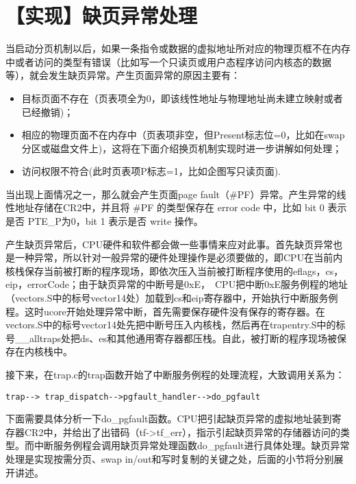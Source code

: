 \section{【实现】缺页异常处理}\label{ux5b9eux73b0ux7f3aux9875ux5f02ux5e38ux5904ux7406}

当启动分页机制以后，如果一条指令或数据的虚拟地址所对应的物理页框不在内存中或者访问的类型有错误（比如写一个只读页或用户态程序访问内核态的数据等），就会发生缺页异常。产生页面异常的原因主要有：

\begin{itemize}
\item
  目标页面不存在（页表项全为0，即该线性地址与物理地址尚未建立映射或者已经撤销)；
\item
  相应的物理页面不在内存中（页表项非空，但Present标志位=0，比如在swap分区或磁盘文件上)，这将在下面介绍换页机制实现时进一步讲解如何处理；
\item
  访问权限不符合(此时页表项P标志=1，比如企图写只读页面).
\end{itemize}

当出现上面情况之一，那么就会产生页面page
fault（\#PF）异常。产生异常的线性地址存储在CR2中，并且将 \#PF
的类型保存在 error code 中，比如 bit 0 表示是否 PTE\_P为0，bit 1
表示是否 write 操作。

产生缺页异常后，CPU硬件和软件都会做一些事情来应对此事。首先缺页异常也是一种异常，所以针对一般异常的硬件处理操作是必须要做的，即CPU在当前内核栈保存当前被打断的程序现场，即依次压入当前被打断程序使用的eflags，cs，eip，errorCode；由于缺页异常的中断号是0xE，~CPU把中断0xE服务例程的地址（vectors.S中的标号vector14处）加载到cs和eip寄存器中，开始执行中断服务例程。这时ucore开始处理异常中断，首先需要保存硬件没有保存的寄存器。在vectors.S中的标号vector14处先把中断号压入内核栈，然后再在trapentry.S中的标号\_\_alltraps处把ds、es和其他通用寄存器都压栈。自此，被打断的程序现场被保存在内核栈中。

接下来，在trap.c的trap函数开始了中断服务例程的处理流程，大致调用关系为：

\begin{lstlisting}
trap--> trap_dispatch-->pgfault_handler-->do_pgfault
\end{lstlisting}

下面需要具体分析一下do\_pgfault函数。CPU把引起缺页异常的虚拟地址装到寄存器CR2中，并给出了出错码（tf-\textgreater{}tf\_err），指示引起缺页异常的存储器访问的类型。而中断服务例程会调用缺页异常处理函数do\_pgfault进行具体处理。缺页异常处理是实现按需分页、swap
in/out和写时复制的关键之处，后面的小节将分别展开讲述。

